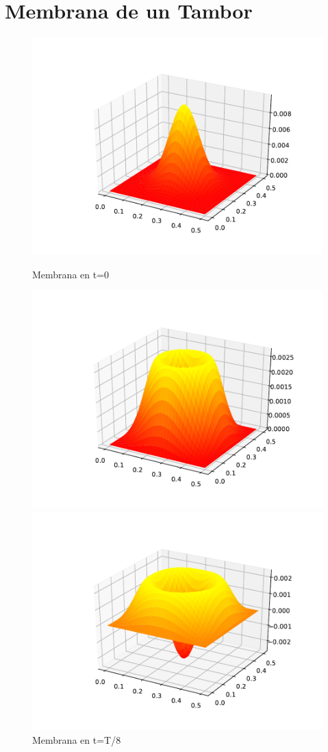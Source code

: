 \documentclass[letter]{article}
\begin{document}
\section{Membrana de un Tambor}
\begin{figure}[h] 
  \begin{minipage}[b]{0.7\linewidth}
    \centering
    \includegraphics[width=.8\linewidth]{Tambor1.pdf} 
    \caption{Membrana en t=0} 
    \vspace{4ex}
  \end{minipage}%
  \begin{minipage}[b]{0.7\linewidth}
    \centering
    \includegraphics[width=.8\linewidth]{Tambor2.pdf} 
    \caption{Membrana en t=T/8} 
    \vspace{4ex}
  \end{minipage} 
  \begin{minipage}[b]{0.7\linewidth}
    \centering
    \includegraphics[width=.8\linewidth]{Tambor3.pdf} 

\end{minipage}
\end{figure}
\end{document}
